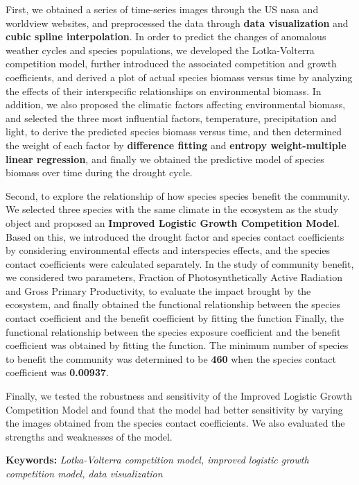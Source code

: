 \documentclass[12pt]{article}
\begin{document}
First, we obtained a series of time-series images through the US nasa and worldview websites, and preprocessed the data through \textbf{data visualization} and \textbf{cubic spline interpolation}. In order to predict the changes of anomalous weather cycles and species populations, we developed the Lotka-Volterra competition model, further introduced the associated competition and growth coefficients, and derived a plot of actual species biomass versus time by analyzing the effects of their interspecific relationships on environmental biomass. In addition, we also proposed the climatic factors affecting environmental biomass, and selected the three most influential factors, temperature, precipitation and light, to derive the predicted species biomass versus time, and then determined the weight of each factor by \textbf{difference fitting} and \textbf{entropy weight-multiple linear regression}, and finally we obtained the predictive model of species biomass over time during the drought cycle.

Second, to explore the relationship of how species species benefit the community. We selected three species with the same climate in the ecosystem as the study object and proposed an \textbf{Improved Logistic Growth Competition Model}. Based on this, we introduced the drought factor and species contact coefficients by considering environmental effects and interspecies effects, and the species contact coefficients were calculated separately. In the study of community benefit, we considered two parameters, Fraction of Photosynthetically Active Radiation and Gross Primary Productivity, to evaluate the impact brought by the ecosystem, and finally obtained the functional relationship between the species contact coefficient and the benefit coefficient by fitting the function Finally, the functional relationship between the species exposure coefficient and the benefit coefficient was obtained by fitting the function. The minimum number of species to benefit the community was determined to be \textbf{460} when the species contact coefficient was \textbf{0.00937}.

Finally, we tested the robustness and sensitivity of the Improved Logistic Growth Competition Model and found that the model had better sensitivity by varying the images obtained from the species contact coefficients. We also evaluated the strengths and weaknesses of the model.

\vspace{0.5cm}

\textbf{Keywords:} \textit{Lotka-Volterra competition model, improved logistic growth competition model, data visualization}
\end{document}
